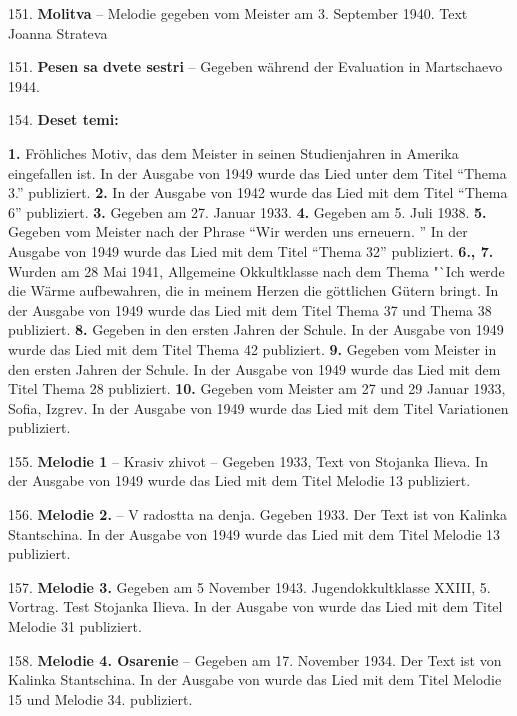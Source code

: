 \documentclass[11pt,a5paper,twoside]{article}
\begin{document}
151. \textbf{Molitva} -- Melodie gegeben vom Meister am 3. September 1940. Text Joanna Strateva

151. \textbf{Pesen sa dvete sestri} -- Gegeben während der Evaluation in Martschaevo 1944.

154. \textbf{Deset temi:}

\textbf{1.} Fröhliches Motiv, das dem Meister in seinen Studienjahren in Amerika eingefallen ist. In der Ausgabe von 1949 wurde das Lied unter dem Titel "`Thema 3."' publiziert. \textbf{2.} In der Ausgabe von 1942 wurde das Lied mit dem Titel "`Thema 6"' publiziert.
\textbf{3.} Gegeben am 27. Januar 1933.
\textbf{4.} Gegeben am 5. Juli 1938. 
\textbf{5.} Gegeben vom Meister nach der Phrase "`Wir werden uns erneuern. "' In der Ausgabe von 1949 wurde das Lied mit dem Titel "`Thema 32"' publiziert. 
\textbf{6., 7.} Wurden am 28 Mai 1941, Allgemeine Okkultklasse nach dem Thema "`Ich werde die Wärme aufbewahren, die in meinem Herzen die göttlichen Gütern bringt. In der Ausgabe von 1949 wurde das Lied mit dem Titel Thema 37 und Thema 38 publiziert.
\textbf{8.} Gegeben in den ersten Jahren der Schule. In der Ausgabe von 1949 wurde das Lied mit dem Titel Thema 42 publiziert.
\textbf{9.} Gegeben vom Meister in den ersten Jahren der Schule. In der Ausgabe von 1949 wurde das Lied mit dem Titel Thema 28 publiziert.
\textbf{10.} Gegeben vom Meister am 27 und 29 Januar 1933, Sofia, Izgrev. In der Ausgabe von 1949 wurde das Lied mit dem Titel Variationen publiziert.

155. \textbf{Melodie 1} -- Krasiv zhivot -- Gegeben 1933, Text von Stojanka Ilieva. In der Ausgabe von 1949 wurde das Lied mit dem Titel Melodie 13 publiziert.

156. \textbf{Melodie 2.} -- V radostta na denja. Gegeben 1933. Der Text ist von Kalinka Stantschina. In der Ausgabe von 1949 wurde das Lied mit dem Titel Melodie 13 publiziert.

157. \textbf{Melodie 3.} Gegeben am 5 November 1943. Jugendokkultklasse XXIII, 5. Vortrag. Test Stojanka Ilieva. In der Ausgabe von wurde das Lied mit dem Titel Melodie 31 publiziert.

158. \textbf{Melodie 4. Osarenie} -- Gegeben am 17. November 1934. Der Text ist von Kalinka Stantschina. In der Ausgabe von wurde das Lied mit dem Titel Melodie 15 und Melodie 34. publiziert.
\end{document}
